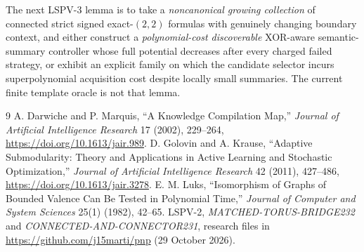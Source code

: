 \documentclass[11pt]{article}
\begin{document}
The next LSPV-3 lemma is to take a \emph{noncanonical growing collection} of connected strict signed exact-$(2,2)$ formulas with genuinely changing boundary context, and either construct a \emph{polynomial-cost discoverable} XOR-aware semantic-summary controller whose full potential decreases after every charged failed strategy, or exhibit an explicit family on which the candidate selector incurs superpolynomial acquisition cost despite locally small summaries. The current finite template oracle is not that lemma.

\begin{thebibliography}{9}
 A. Darwiche and P. Marquis, ``A Knowledge Compilation Map,'' \emph{Journal of Artificial Intelligence Research} 17 (2002), 229--264, \url{https://doi.org/10.1613/jair.989}.
 D. Golovin and A. Krause, ``Adaptive Submodularity: Theory and Applications in Active Learning and Stochastic Optimization,'' \emph{Journal of Artificial Intelligence Research} 42 (2011), 427--486, \url{https://doi.org/10.1613/jair.3278}.
 E. M. Luks, ``Isomorphism of Graphs of Bounded Valence Can Be Tested in Polynomial Time,'' \emph{Journal of Computer and System Sciences} 25(1) (1982), 42--65.
 LSPV-2, \emph{MATCHED-TORUS-BRIDGE232} and \emph{CONNECTED-AND-CONNECTOR231}, research files in \url{https://github.com/j15marti/pnp} (29 October 2026).
\end{thebibliography}
\end{document}
